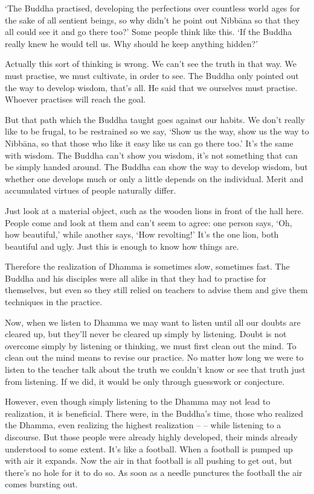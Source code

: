 `The Buddha practised, developing the perfections over countless world ages for the sake of all sentient beings, so why didn't he point out Nibb\=ana so that they all could see it and go there too?' Some people think like this. `If the Buddha really knew he would tell us. Why should he keep anything hidden?' 

Actually this sort of thinking is wrong. We can't see the truth in that way. We must practise, we must cultivate, in order to see. The Buddha only pointed out the way to develop wisdom, that's all. He said that we ourselves must practise. Whoever practises will reach the goal. 

But that path which the Buddha taught goes against our habits. We don't really like to be frugal, to be restrained so we say, `Show us the way, show us the way to Nibb\=ana, so that those who like it easy like us can go there too.' It's the same with wisdom. The Buddha can't show you wisdom, it's not something that can be simply handed around. The Buddha can show the way to develop wisdom, but whether one develops much or only a little depends on the individual. Merit and accumulated virtues of people naturally differ. 

Just look at a material object, such as the wooden lions in front of the hall here. People come and look at them and can't seem to agree: one person says, `Oh, how beautiful,' while another says, `How revolting!' It's the one lion, both beautiful and ugly. Just this is enough to know how things are. 

Therefore the realization of Dhamma is sometimes slow, sometimes fast. The Buddha and his disciples were all alike in that they had to practise for themselves, but even so they still relied on teachers to advise them and give them techniques in the practice. 

Now, when we listen to Dhamma we may want to listen until all our doubts are cleared up, but they'll never be cleared up simply by listening. Doubt is not overcome simply by listening or thinking, we must first clean out the mind. To clean out the mind means to revise our practice. No matter how long we were to listen to the teacher talk about the truth we couldn't know or see that truth just from listening. If we did, it would be only through guesswork or conjecture. 

However, even though simply listening to the Dhamma may not lead to realization, it is beneficial. There were, in the Buddha's time, those who realized the Dhamma, even realizing the highest realization --  -- while listening to a discourse. But those people were already highly developed, their minds already understood to some extent. It's like a football. When a football is pumped up with air it expands. Now the air in that football is all pushing to get out, but there's no hole for it to do so. As soon as a needle punctures the football the air comes bursting out. 

